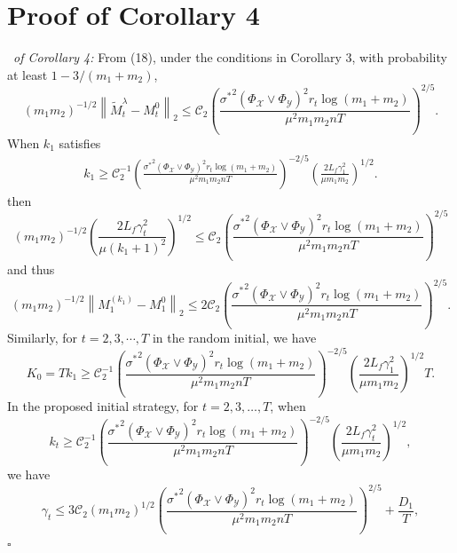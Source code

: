\documentclass[12pt]{article}
\newenvironment{pf}{{\noindent\it Proof}\ }{\hfill $\square$\par}
\begin{document}
\section{Proof of Corollary 4}
\label{sec:iteration}
\begin{pf}{\it of Corollary 4:}
  From (18), under the conditions in Corollary 3, with probability at least $1-3/(m_1+m_2)$, 
   \begin{equation*}
  (m_1m_2)^{-1/2}\left\|\widetilde{M}_t^\lambda - M_t^0\right\|_2 \le \mathcal{C}_2\left(\frac{{\sigma^*}^2(\Phi_\mathcal{X}\vee \Phi_\mathcal{Y})^2r_t\log(m_1+m_2)}{\mu^2m_1m_2 n T}\right)^{2/5}.
  \end{equation*}
  When $k_1$ satisfies
  \begin{align*}
      k_1 \ge \mathcal{C}_2^{-1}\left(\frac{{\sigma^*}^2(\Phi_\mathcal{X}\vee \Phi_\mathcal{Y})^2r_t\log(m_1+m_2)}{\mu^2m_1m_2 n T}\right)^{-2/5} \left(\frac{2L_f\gamma_1^2}{\mu m_1m_2}\right)^{1/2}.
  \end{align*}
  then
  \begin{equation*}
      (m_1m_2)^{-1/2} \left(\frac{2 L_f\gamma_t^2}{\mu (k_1+1)^2}\right)^{1/2} \le \mathcal{C}_2\left(\frac{{\sigma^*}^2(\Phi_\mathcal{X}\vee \Phi_\mathcal{Y})^2r_t\log(m_1+m_2)}{\mu^2m_1m_2 n T}\right)^{2/5}
  \end{equation*}
  and thus
  \begin{equation*}
      (m_1m_2)^{-1/2} \left\|M_1^{(k_1)} - M_1^0\right\|_2 \le 2\mathcal{C}_2\left(\frac{{\sigma^*}^2(\Phi_\mathcal{X}\vee \Phi_\mathcal{Y})^2r_t\log(m_1+m_2)}{\mu^2m_1m_2 n T}\right)^{2/5}.
  \end{equation*}
  Similarly, for $t=2,3,\cdots,T$ in the random initial, we have 
  \begin{equation*}
      K_0 =T k_1 \ge \mathcal{C}_2^{-1}\left(\frac{{\sigma^*}^2(\Phi_\mathcal{X}\vee \Phi_\mathcal{Y})^2r_t\log(m_1+m_2)}{\mu^2m_1m_2 n T}\right)^{-2/5} \left(\frac{2L_f\gamma_1^2}{\mu m_1m_2}\right)^{1/2}T.
  \end{equation*}
  In the proposed initial strategy, for $t=2,3,\dots,T$,   when 
  \begin{equation*}
  k_t \ge \mathcal{C}_2^{-1}\left(\frac{{\sigma^*}^2(\Phi_\mathcal{X}\vee \Phi_\mathcal{Y})^2r_t\log(m_1+m_2)}{\mu^2m_1m_2 n T}\right)^{-2/5} \left(\frac{2L_f\gamma_t^2}{\mu m_1m_2}\right)^{1/2},
  \end{equation*}
  we have
  \begin{equation*}
  \gamma_t \le 3\mathcal{C}_2(m_1m_2)^{1/2}\left(\frac{{\sigma^*}^2(\Phi_\mathcal{X}\vee \Phi_\mathcal{Y})^2r_t\log(m_1+m_2)}{\mu^2m_1m_2 n T}\right)^{2/5}+ \frac{D_1}{T},

\end{equation*}
\end{pf}
\end{document}
